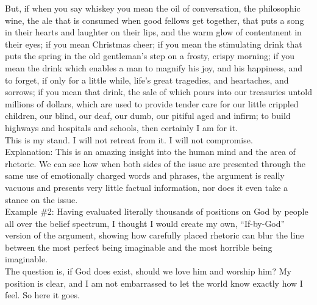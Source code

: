 \documentclass[a4paper,12pt,single,pdftex]{scrartcl}
\begin{document}
    
      But, if when you say whiskey you mean the oil of conversation, the philosophic wine, the ale that is consumed when good fellows get together, that puts a song in their hearts and laughter on their lips, and the warm glow of contentment in their eyes; if you mean Christmas cheer; if you mean the stimulating drink that puts the spring in the old gentleman’s step on a frosty, crispy morning; if you mean the drink which enables a man to magnify his joy, and his happiness, and to forget, if only for a little while, life’s great tragedies, and heartaches, and sorrows; if you mean that drink, the sale of which pours into our treasuries untold millions of dollars, which are used to provide tender care for our little crippled children, our blind, our deaf, our dumb, our pitiful aged and infirm; to build highways and hospitals and schools, then certainly I am for it.
    \\

    
      This is my stand. I will not retreat from it. I will not compromise.
    \\

    
      Explanation: This is an amazing insight into the human mind and the area of rhetoric.  We can see how when both sides of the issue are presented through the same use of emotionally charged words and phrases, the argument is really vacuous and presents very little factual information, nor does it even take a stance on the issue.
    \\

    
      Example \#2: Having evaluated literally thousands of positions on God by people all over the belief spectrum, I thought I would create my own, “If-by-God” version of the argument, showing how carefully placed rhetoric can blur the line between the most perfect being imaginable and the most horrible being imaginable.
    \\

    
      The question is, if God does exist, should we love him and worship him?  My position is clear, and I am not embarrassed to let the world know exactly how I feel.  So here it goes.
    \\
\end{document}
